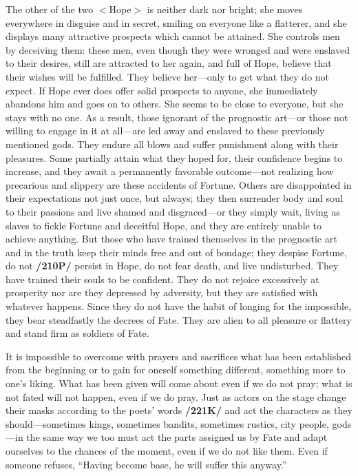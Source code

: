 The other of the two $<$Hope$>$ is neither dark nor bright; she moves everywhere in disguise and in secret, smiling on everyone like a flatterer, and she displays many attractive prospects which cannot be attained. She controls men by deceiving them: these men, even though they were wronged and were enslaved to their desires, still are attracted to her again, and full of Hope, believe that their wishes will be fulfilled. They believe her—only to get what they do not expect. If Hope ever does offer solid prospects to anyone, she immediately abandons him and goes on to others. She seems to be close to everyone, but she stays with no one. As a result, those ignorant of the prognostic art—or those not willing to engage in it at all—are led
away and enslaved to these previously mentioned gods. They endure all blows and suffer punishment along with their pleasures. Some partially attain what they hoped for, their confidence begins to increase, and they await a permanently favorable outcome—not realizing how precarious and slippery are these accidents of Fortune. Others are disappointed in their expectations not just once, but always; they then surrender body and soul to their passions and live shamed and disgraced—or they simply wait, living as slaves to fickle Fortune and deceitful Hope, and they are entirely unable to achieve anything. But those who have trained themselves in the prognostic art and in the truth keep their minds free and out of bondage; they despise Fortune, do not \textbf{/210P/} persist in Hope, do not fear death, and live undisturbed. They have trained their souls to be confident. They do not rejoice excessively at prosperity nor are they depressed by adversity, but they are satisfied with whatever happens. Since they do not have the habit of longing for the impossible, they bear steadfastly the decrees of Fate. They are alien to all pleasure or flattery and stand firm as soldiers of Fate.

It is impossible to overcome with prayers and sacrifices what has been established from the beginning or to gain for oneself something different, something more to one’s liking. What has been given will come about even if we do not pray; what is not fated will not happen, even if we do pray. Just as actors on the stage change their masks according to the poets’ words \textbf{/221K/} and act the characters as they should—sometimes kings, sometimes bandits, sometimes rustics, city people, gods—in the same way we too must act the parts assigned us by Fate and adapt ourselves to the chances of the moment, even if we do not like them. Even if someone refuses,
“Having become base, he will suffer this anyway.” 

